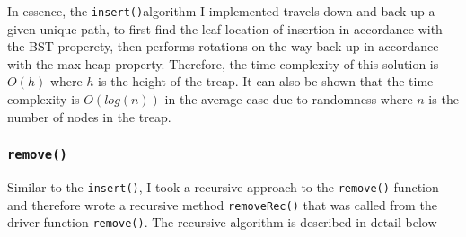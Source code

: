 \documentclass[11pt]{article}
\def\tt{\texttt}
\def\ins{\tt{insert()}}
\def\rem{\tt{remove()}}
\begin{document}
In essence, the \ins algorithm I implemented travels down and back up a given unique path, to first find the leaf location of insertion in accordance with the BST properety, then performs rotations on the way back up in accordance with the max heap property. Therefore, the time complexity of this solution is $O(h)$ where $h$ is the height of the treap. It can also be shown that the time complexity is $O(log(n))$ in the average case due to randomness where $n$ is the number of nodes in the treap.

\subsubsection{\rem}
Similar to the \ins, I took a recursive approach to the \rem{} function and therefore wrote a recursive method \tt{removeRec()} that was called from the driver function \rem. The recursive algorithm is described in detail below
\end{document}
